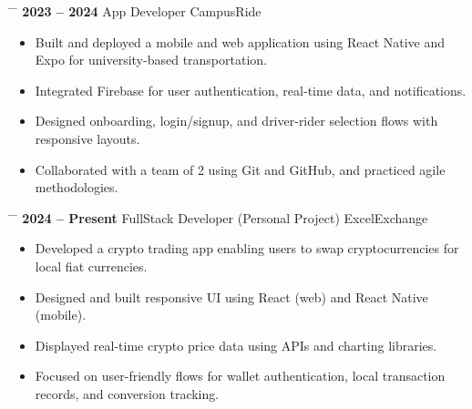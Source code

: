 \documentclass{article}
\begin{document}
\noindent
\begin{tabbing}
    \hspace{5cm} \= \hspace{8cm} \= \kill
    \textbf{2023 -- 2024} \> App Developer  \> CampusRide \\[0.1cm]
\end{tabbing}
\vspace{-0.3cm}
\begin{itemize}
    \item Built and deployed a mobile and web application using React Native and Expo for university-based transportation.
    \item Integrated Firebase for user authentication, real-time data, and notifications.
    \item Designed onboarding, login/signup, and driver-rider selection flows with responsive layouts.
    \item Collaborated with a team of 2 using Git and GitHub, and practiced agile methodologies.
\end{itemize}

\vspace{0.2cm}
\noindent
\begin{tabbing}
    \hspace{5cm} \= \hspace{8cm} \= \kill 
    \textbf{2024 -- Present} \> FullStack Developer (Personal Project)  \> ExcelExchange \\[0.1cm]
\end{tabbing}
\vspace{-0.3cm}
\begin{itemize}
    \item Developed a crypto trading app enabling users to swap cryptocurrencies for local fiat currencies.
    \item Designed and built responsive UI using React (web) and React Native (mobile).
    \item Displayed real-time crypto price data using APIs and charting libraries.
    \item Focused on user-friendly flows for wallet authentication, local transaction records, and conversion tracking.
\end{itemize}
\end{document}
